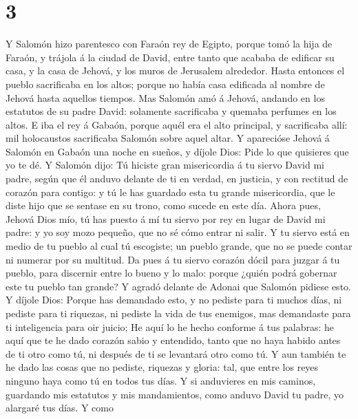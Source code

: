 \hypertarget{section-2}{%
\section{3}\label{section-2}}

 Y Salomón hizo parentesco con Faraón rey de Egipto,
porque tomó la hija de Faraón, y trájola á la ciudad de David, entre
tanto que acababa de edificar su casa, y la casa de Jehová, y los muros
de Jerusalem alrededor.  Hasta entonces el pueblo
sacrificaba en los altos; porque no había casa edificada al nombre de
Jehová hasta aquellos tiempos.  Mas Salomón amó á Jehová,
andando en los estatutos de su padre David: solamente sacrificaba y
quemaba perfumes en los altos.  E iba el rey á Gabaón,
porque aquél era el alto principal, y sacrificaba allí: mil holocaustos
sacrificaba Salomón sobre aquel altar.  Y aparecióse
Jehová á Salomón en Gabaón una noche en sueños, y díjole Dios: Pide lo
que quisieres que yo te dé.  Y Salomón dijo: Tú hiciste
gran misericordia á tu siervo David mi padre, según que él anduvo
delante de ti en verdad, en justicia, y con rectitud de corazón para
contigo: y tú le has guardado esta tu grande misericordia, que le diste
hijo que se sentase en su trono, como sucede en este día. 
Ahora pues, Jehová Dios mío, tú has puesto á mí tu siervo por rey en
lugar de David mi padre: y yo soy mozo pequeño, que no sé cómo entrar ni
salir.  Y tu siervo está en medio de tu pueblo al cual tú
escogiste; un pueblo grande, que no se puede contar ni numerar por su
multitud.  Da pues á tu siervo corazón dócil para juzgar á
tu pueblo, para discernir entre lo bueno y lo malo: porque ¿quién podrá
gobernar este tu pueblo tan grande?  Y agradó delante de
Adonai que Salomón pidiese esto.  Y díjole Dios: Porque
has demandado esto, y no pediste para ti muchos días, ni pediste para ti
riquezas, ni pediste la vida de tus enemigos, mas demandaste para ti
inteligencia para oir juicio;  He aquí lo he hecho
conforme á tus palabras: he aquí que te he dado corazón sabio y
entendido, tanto que no haya habido antes de ti otro como tú, ni después
de ti se levantará otro como tú.  Y aun también te he
dado las cosas que no pediste, riquezas y gloria: tal, que entre los
reyes ninguno haya como tú en todos tus días.  Y si
anduvieres en mis caminos, guardando mis estatutos y mis mandamientos,
como anduvo David tu padre, yo alargaré tus días.  Y como
